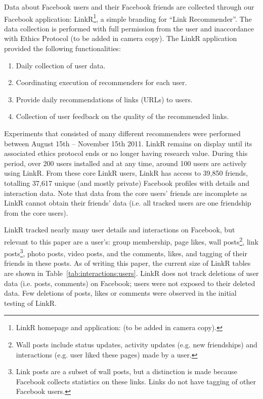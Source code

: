 \documentclass[letterpaper]{article}
\begin{document}
Data about Facebook users and their Facebook friends are collected through our Facebook application: LinkR\footnote{LinkR homepage and application: (to be added in camera copy).}, a simple branding for ``Link Recommender''. The data collection is performed with full permission from the user and inaccordance with Ethics Protocol (to be added in camera copy). The LinkR application provided the following functionalities:
\begin{enumerate}
\item Daily collection of user data.
\item Coordinating execution of recommenders for each user.
\item Provide daily recommendations of links (URLs) to users.
\item Collection of user feedback on the quality of the recommended links.
\end{enumerate}
Experiments that consisted of many different recommenders were performed between August 15th -- November 15th 2011. LinkR remains on display until its associated ethics protocol ends or no longer having research value. During this period, over 200 users installed and at any time, around 100 users are actively using LinkR. From these core LinkR users, LinkR has access to 39,850 friends, totalling 37,617 unique (and mostly private) Facebook profiles with details and interaction data. Note that data from the core users' friends are incomplete as LinkR cannot obtain their friends' data (i.e. all tracked users are one friendship from the core users).


LinkR tracked nearly many user details and interactions on Facebook, but relevant to this paper are a user's: group membership, page likes, wall posts\footnote{Wall posts include status updates, activity updates (e.g. new friendships) and interactions (e.g. user liked these pages) made by a user.}, link posts\footnote{Link posts are a subset of wall posts, but a distinction is made because Facebook collects statistics on these links. Links do not have tagging of other Facebook users.}, photo posts, video posts, and the comments, likes, and tagging of their friends in these posts. As of writing this paper, the current size of LinkR tables are shown in Table~\ref{tab:interactions:users}. LinkR does not track deletions of user data (i.e. posts, comments) on Facebook; users were not exposed to their deleted data. Few deletions of posts, likes or comments were observed in the initial testing of LinkR.
\end{document}
